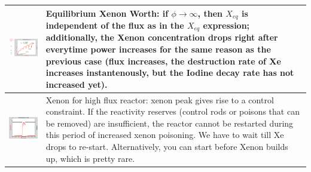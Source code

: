 \documentclass{school-22.211-notes}
\begin{document}
\begin{enumerate}
\begin{table}
\begin{tabular}{|p{}|p{}|}
%
    \begin{minipage}[b]{0.6\textwidth}
      \includegraphics[width=3.5in]{images/dfs/I-Xe-3.png}
    \end{minipage}
 &  
    \begin{minipage}[b]{0.4\textwidth}    
      Equilibrium Xenon Worth: if $\phi \to \infty$, then $X_{eq}$ is independent of the flux as in the $X_{eq}$ expression; additionally, the Xenon concentration drops right after everytime power increases for the same reason as the previous case (flux increases, the destruction rate of Xe increases instantenously, but the Iodine decay rate has not increased yet). 
    \end{minipage} \\ \hline
%
    \begin{minipage}[b]{0.6\textwidth}
    \includegraphics[width=3.5in]{images/dfs/I-Xe-4.png}
    \end{minipage}
 &  
    \begin{minipage}[b]{0.4\textwidth}
      Xenon for high flux reactor: xenon peak gives rise to a control constraint. If the reactivity reserves (control rods or poisons that can be removed) are insufficient, the reactor cannot be restarted during this period of increased xenon poisoning. We have to wait till Xe drops to re-start. Alternatively, you can start before Xenon builds up, which is pretty rare. 
      \end{minipage} \\ \hline
  \end{tabular}
\end{table}


\end{enumerate}
\end{document}
